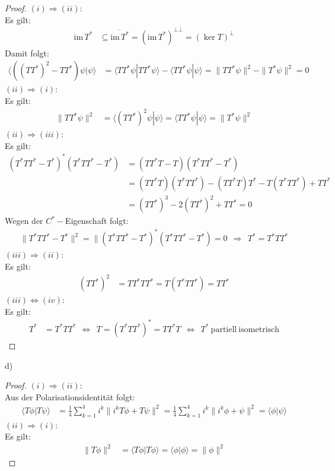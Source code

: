 \documentclass[a4paper,12pt]{article}
\newcommand{\brak}{}
\newcommand{\kla}{}
\begin{document}
\begin{proof}
$(i)\Rightarrow(ii)$: \\
Es gilt:
\begin{align*}
\mathrm{im\,}T^\ast &\subseteq \overline{\mathrm{im\,}T^\ast}=\kla\left( {\mathrm{im\,}T^\ast} \right)^{\bot \bot}=\kla\left( {\ker T} \right)^\bot
\end{align*}
Damit folgt:
\begin{align*}
\brak\langle {\kla\left( {(TT^\ast)^2-TT^\ast} \right)\psi}| {\psi}\rangle&=\brak\langle {TT^\ast\psi}| {TT^\ast\psi}\rangle-\brak\langle {TT^\ast\psi}| {\psi}\rangle=\|TT^\ast\psi\|^2-\|T^\ast\psi\|^2=0
\end{align*}
$(ii)\Rightarrow(i)$: \\
Es gilt:
\begin{align*}
\|TT^\ast\psi\|^2&=\brak\langle {(TT^\ast)^2\psi}| {\psi}\rangle=\brak\langle {TT^\ast\psi}| {\psi}\rangle=\|T^\ast\psi\|^2
\end{align*}
$(ii)\Rightarrow(iii)$: \\
Es gilt: 
\begin{align*}
(T^\ast TT^\ast - T^\ast)^\ast (T^\ast TT^\ast - T^\ast)&=(TT^\ast T-T) (T^\ast TT^\ast - T^\ast) \\
&=(TT^\ast T)(T^\ast TT^\ast)-(TT^\ast T)T^\ast - T(T^\ast TT^\ast)+TT^\ast \\
&=(TT^\ast)^3-2(TT^\ast)^2+TT^\ast =0
\end{align*}
Wegen der $C^\ast -$Eigenschaft folgt:
\begin{align*}
\|T^\ast TT^\ast -T^\ast\|^2=\|(T^\ast TT^\ast -T^\ast)^\ast (T^\ast TT^\ast - T^\ast)=0\ \ \Rightarrow\ \ T^\ast = T^\ast TT^\ast
\end{align*}
$(iii)\Rightarrow(ii)$: \\
Es gilt:
\begin{align*}
(TT^\ast)^2&=TT^\ast TT^\ast = T(T^\ast TT^\ast)=TT^\ast
\end{align*}
$(iii)\Leftrightarrow(iv)$: \\
Es gilt:
\begin{align*}
T^\ast &=T^\ast TT^\ast\ \ \Leftrightarrow\ \ T=(T^\ast TT^\ast)^\ast = TT^\ast T\ \ \Leftrightarrow\ \ T^\ast\ \mathrm{partiell\ isometrisch}
\end{align*}
\end{proof}
d)
\begin{proof}
$(i)\Rightarrow(ii)$:\\
Aus der Polarisationsidentität folgt:
\begin{align*}
\brak\langle {T\phi}| {T\psi}\rangle&=\frac{1}{4}\sum_{k=1}^4i^k\|i^k T\phi+T\psi\|^2=\frac{1}{4}\sum_{k=1}^4i^k\|i^k \phi+\psi\|^2=\brak\langle {\phi}| {\psi}\rangle
\end{align*}
$(ii)\Rightarrow(i)$:\\
Es gilt:
\begin{align*}
\|T\phi\|^2&=\brak\langle {T\phi}| {T\phi}\rangle=\brak\langle {\phi}| {\phi}\rangle=\|\phi\|^2
\end{align*}
\end{proof}
\end{document}
